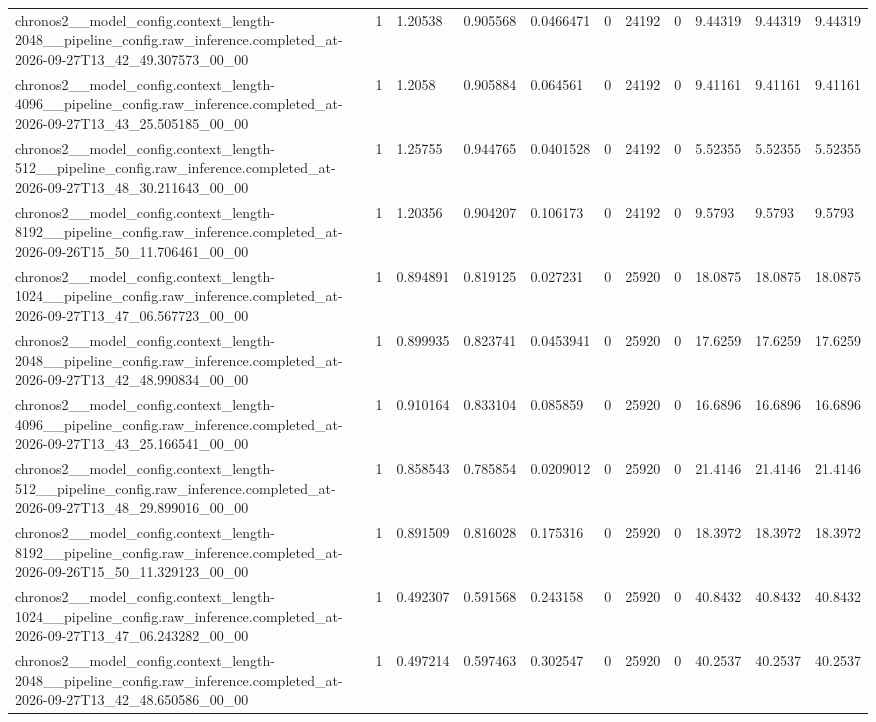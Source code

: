 \begin{tabular}{lllllllllll}
chronos2\_\_model\_config.context\_length-2048\_\_pipeline\_config.raw\_inference.completed\_at-2026-09-27T13\_42\_49.307573\_00\_00 & 1 & 1.20538 & 0.905568 & 0.0466471 & 0 & 24192 & 0 & 9.44319 & 9.44319 & 9.44319 \\
chronos2\_\_model\_config.context\_length-4096\_\_pipeline\_config.raw\_inference.completed\_at-2026-09-27T13\_43\_25.505185\_00\_00 & 1 & 1.2058 & 0.905884 & 0.064561 & 0 & 24192 & 0 & 9.41161 & 9.41161 & 9.41161 \\
chronos2\_\_model\_config.context\_length-512\_\_pipeline\_config.raw\_inference.completed\_at-2026-09-27T13\_48\_30.211643\_00\_00 & 1 & 1.25755 & 0.944765 & 0.0401528 & 0 & 24192 & 0 & 5.52355 & 5.52355 & 5.52355 \\
chronos2\_\_model\_config.context\_length-8192\_\_pipeline\_config.raw\_inference.completed\_at-2026-09-26T15\_50\_11.706461\_00\_00 & 1 & 1.20356 & 0.904207 & 0.106173 & 0 & 24192 & 0 & 9.5793 & 9.5793 & 9.5793 \\
chronos2\_\_model\_config.context\_length-1024\_\_pipeline\_config.raw\_inference.completed\_at-2026-09-27T13\_47\_06.567723\_00\_00 & 1 & 0.894891 & 0.819125 & 0.027231 & 0 & 25920 & 0 & 18.0875 & 18.0875 & 18.0875 \\
chronos2\_\_model\_config.context\_length-2048\_\_pipeline\_config.raw\_inference.completed\_at-2026-09-27T13\_42\_48.990834\_00\_00 & 1 & 0.899935 & 0.823741 & 0.0453941 & 0 & 25920 & 0 & 17.6259 & 17.6259 & 17.6259 \\
chronos2\_\_model\_config.context\_length-4096\_\_pipeline\_config.raw\_inference.completed\_at-2026-09-27T13\_43\_25.166541\_00\_00 & 1 & 0.910164 & 0.833104 & 0.085859 & 0 & 25920 & 0 & 16.6896 & 16.6896 & 16.6896 \\
chronos2\_\_model\_config.context\_length-512\_\_pipeline\_config.raw\_inference.completed\_at-2026-09-27T13\_48\_29.899016\_00\_00 & 1 & 0.858543 & 0.785854 & 0.0209012 & 0 & 25920 & 0 & 21.4146 & 21.4146 & 21.4146 \\
chronos2\_\_model\_config.context\_length-8192\_\_pipeline\_config.raw\_inference.completed\_at-2026-09-26T15\_50\_11.329123\_00\_00 & 1 & 0.891509 & 0.816028 & 0.175316 & 0 & 25920 & 0 & 18.3972 & 18.3972 & 18.3972 \\
chronos2\_\_model\_config.context\_length-1024\_\_pipeline\_config.raw\_inference.completed\_at-2026-09-27T13\_47\_06.243282\_00\_00 & 1 & 0.492307 & 0.591568 & 0.243158 & 0 & 25920 & 0 & 40.8432 & 40.8432 & 40.8432 \\
chronos2\_\_model\_config.context\_length-2048\_\_pipeline\_config.raw\_inference.completed\_at-2026-09-27T13\_42\_48.650586\_00\_00 & 1 & 0.497214 & 0.597463 & 0.302547 & 0 & 25920 & 0 & 40.2537 & 40.2537 & 40.2537 \\

\end{tabular}
